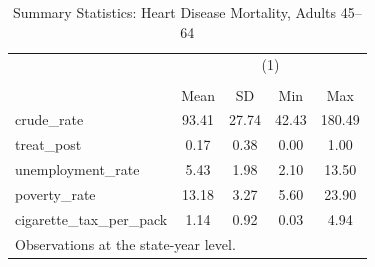 \begin{table}[htbp]\centering
\caption{Summary Statistics: Heart Disease Mortality, Adults 45--64}
\begin{tabular}{l*{1}{cccc}}
\toprule
                    &\multicolumn{4}{c}{(1)}                            \\
                    &\multicolumn{4}{c}{}                               \\
                    &        Mean&          SD&         Min&         Max\\
\midrule
crude\_rate          &       93.41&       27.74&       42.43&      180.49\\
treat\_post          &        0.17&        0.38&        0.00&        1.00\\
unemployment\_rate   &        5.43&        1.98&        2.10&       13.50\\
poverty\_rate        &       13.18&        3.27&        5.60&       23.90\\
cigarette\_tax\_per\_pack&        1.14&        0.92&        0.03&        4.94\\
\bottomrule
\multicolumn{5}{l}{\footnotesize Observations at the state-year level.}\\
\end{tabular}
\end{table}
